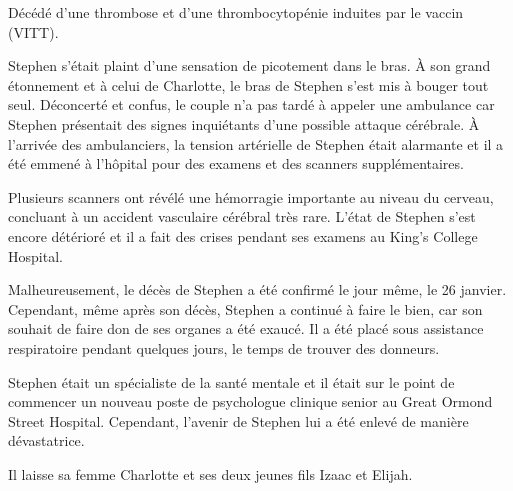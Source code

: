 Décédé d'une thrombose et d'une thrombocytopénie induites par le vaccin (VITT).

Stephen s'était plaint d'une sensation de picotement dans le bras. À son grand
étonnement et à celui de Charlotte, le bras de Stephen s'est mis à bouger tout
seul. Déconcerté et confus, le couple n'a pas tardé à appeler une ambulance car
Stephen présentait des signes inquiétants d'une possible attaque cérébrale. À
l'arrivée des ambulanciers, la tension artérielle de Stephen était alarmante et
il a été emmené à l'hôpital pour des examens et des scanners supplémentaires.

Plusieurs scanners ont révélé une hémorragie importante au niveau du cerveau,
concluant à un accident vasculaire cérébral très rare. L'état de Stephen s'est
encore détérioré et il a fait des crises pendant ses examens au King's College
Hospital.

Malheureusement, le décès de Stephen a été confirmé le jour même, le 26
janvier. Cependant, même après son décès, Stephen a continué à faire le bien,
car son souhait de faire don de ses organes a été exaucé. Il a été placé sous
assistance respiratoire pendant quelques jours, le temps de trouver des
donneurs.

Stephen était un spécialiste de la santé mentale et il était sur le point de
commencer un nouveau poste de psychologue clinique senior au Great Ormond Street
Hospital. Cependant, l'avenir de Stephen lui a été enlevé de manière
dévastatrice.

Il laisse sa femme Charlotte et ses deux jeunes fils Izaac et Elijah.

